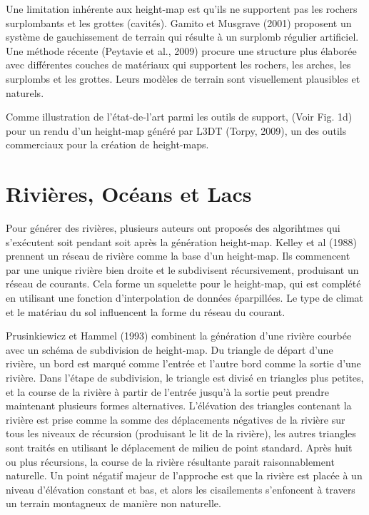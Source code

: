\documentclass[11pt]{report}
\begin{document}
\newline

Une limitation inhérente aux height-map est qu'ils ne supportent pas les rochers surplombants et les grottes (cavités). Gamito et Musgrave (2001) proposent un système de gauchissement de terrain qui résulte à un surplomb régulier artificiel. Une méthode récente (Peytavie et al., 2009) procure une structure plus élaborée avec différentes couches de matériaux qui supportent les rochers, les arches, les surplombs et les grottes. Leurs modèles de terrain sont visuellement plausibles et naturels.\newline

Comme illustration de l'état-de-l'art parmi les outils de support, (Voir Fig. 1d) pour un rendu d'un height-map généré par L3DT (Torpy, 2009), un des outils commerciaux pour la création de height-maps.

\section{Rivières, Océans et Lacs}

Pour générer des rivières, plusieurs auteurs ont proposés des algorihtmes qui s'exécutent soit pendant soit après la génération height-map. Kelley et al (1988) prennent un réseau de rivière comme la base d'un height-map. Ils commencent par une unique rivière bien droite et le subdivisent récursivement, produisant un réseau de courants. Cela forme un squelette pour le height-map, qui est complété en utilisant une fonction d'interpolation de données éparpillées. Le type de climat et le matériau du sol influencent la forme du réseau du courant. \newline

Prusinkiewicz et Hammel (1993) combinent la génération d'une rivière courbée avec un schéma de subdivision de height-map. Du triangle de départ d'une rivière, un bord est marqué comme l'entrée et l'autre bord comme la sortie d'une rivière. Dans l'étape de subdivision, le triangle est divisé en triangles plus petites, et la course de la rivière à partir de l'entrée jusqu'à la sortie peut prendre maintenant plusieurs formes alternatives. L'élévation des triangles contenant la rivière est prise comme la somme des déplacements négatives de la rivière sur tous les niveaux de récursion (produisant le lit de la rivière), les autres triangles sont traités en utilisant le déplacement de milieu de point standard. Après huit ou plus récursions, la course de la rivière résultante parait raisonnablement naturelle. Un point négatif majeur de l'approche est que la rivière est placée à un niveau d'élévation constant et bas, et alors les cisailements s'enfoncent à travers un terrain montagneux de manière non naturelle. \newline
\end{document}
